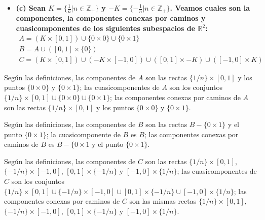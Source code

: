 \documentclass{article}
\begin{document}
\begin{itemize}
\item \bf (c) \rm Sean $K=\{\frac{1}{n}|n\in\mathbb{Z}_+\}$ y $-K=\{-\frac{1}{n}|n\in\mathbb{Z}_+\}$. Veamos cuales son la componentes, la componentes conexas por caminos y cuasicomponentes de los siguientes subespacios de $\mathbb{R}^2$:
\begin{eqnarray}
A=(K\times [0,1])\cup \{0\times 0\}\cup \{0\times 1\}\nonumber\\
B=A\cup([0,1]\times\{0\})\nonumber\\
C=(K\times [0,1])\cup (-K\times [-1,0])\cup ([0,1]\times -K)\cup ([-1,0]\times K)\nonumber
\end{eqnarray}
\end{itemize}
Según las definiciones, las componentes de $A$ son las rectas $\{1/n\}\times [0,1]$ y los puntos $\{0\times 0\}$ y $\{0\times 1\}$; las cuasicomponentes de $A$ son los conjuntos $\{1/n\}\times [0,1]\cup\{0\times 0\}\cup\{0\times 1\}$; las componentes conexas por caminos de $A$ son las rectas $\{1/n\}\times [0,1]$ y los puntos $\{0\times 0\}$ y $\{0\times 1\}$.

Según las definiciones, las componentes de $B$ son las rectas $B-\{0\times 1\}$ y el punto $\{0\times 1\}$; la cuasicomponente de $B$ es $B$; las componentes conexas por caminos de $B$ es $B-\{0\times 1$ y el punto $\{0\times 1\}$.

Según las definiciones, las componentes de $C$ son las rectas $\{1/n\}\times [0,1]$, $\{-1/n\}\times [-1,0]$, $[0,1]\times \{-1/n\}$ y $[-1,0]\times\{1/n\}$; las cuasicomponentes de $C$ son los conjuntos $\{1/n\}\times [0,1]\cup\{-1/n\}\times [-1,0]\cup[0,1]\times \{-1/n\}\cup[-1,0]\times\{1/n\}$; las componentes conexas por caminos de $C$ son las mismas rectas $\{1/n\}\times [0,1]$, $\{-1/n\}\times [-1,0]$, $[0,1]\times \{-1/n\}$ y $[-1,0]\times\{1/n\}$.
\end{document}
